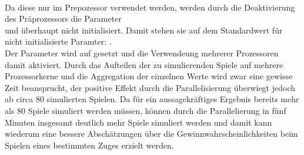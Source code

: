 \\Da diese nur im Prepozessor verwendet werden, werden durch die Deaktivierung des Präprozessors die Parameter \\ und  überhaupt nicht initialisiert. Damit stehen sie auf dem Standardwert für nicht initialisierte Paramter: .
\\Der Parameter  wird auf  gesetzt und die Verwendeung mehrerer Prozessoren damit aktiviert. Durch das Aufteilen der zu simulierenden Spiele auf mehrere Prozessorkerne und die Aggregation der einzelnen Werte wird zwar eine gewisse Zeit beansprucht, der positive Effekt durch die Parallelisierung überwiegt jedoch ab circa 80 simulierten Spielen. Da für ein aussagekräftiges Ergebnis bereits mehr als 80 Spiele simuliert werden müssen, können durch die Parallelierung in fünf Minuten insgesamt deutlich mehr Spiele simuliert werden und damit kann wiederum eine bessere Abschätzungen über die Gewinnwahrscheinlichkeiten beim Spielen eines bestimmten Zuges erzielt werden.
\newpage
